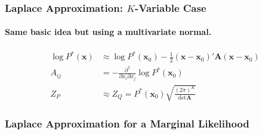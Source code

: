 \begin{frame}
  \frametitle{Laplace Approximation: $K$-Variable Case}

  \framesubtitle{Same basic idea but using a multivariate normal.}

\begin{align*}
   \log P^*(\mathbf{x}) &\approx \log P^*(\mathbf{x}_0) - \frac{1}{2} (\mathbf{x} - \mathbf{x}_0)' \mathbf{A} (\mathbf{x} - \mathbf{x}_0)\\
   A_{ij} &= -\frac{\partial^2}{\partial x_i \partial x_j} \log P^*(\mathbf{x}_0)\\
   Z_P &\approx Z_Q = P^*(\mathbf{x}_0) \sqrt{\frac{(2\pi)^K}{\text{det}\mathbf{A}}}
 \end{align*}

\end{frame}
\begin{frame}
  \frametitle{Laplace Approximation for a Marginal Likelihood}
\end{frame}
